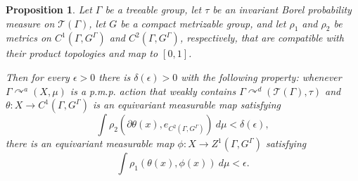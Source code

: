 \documentclass[12pt]{amsart}
\newtheorem{prop}[thm]{Proposition}
\theoremstyle{definition}
\def\cal{\mathcal}
\newcommand{\pmp}{p{$.$}m{$.$}p{$.$}}
\newcommand{\acts}{\curvearrowright}
\begin{document}
\begin{prop} \label{prop:weaktree}
	Let $\Gamma$ be a treeable group, let $\tau$ be an invariant Borel probability measure on $\cal T(\Gamma)$, let $G$ be a compact metrizable group, and let $\rho_1$ and $\rho_2$ be metrics on $C^1(\Gamma, G^\Gamma)$ and $C^2(\Gamma, G^\Gamma)$, respectively, that are compatible with their product topologies and map to $[0,1]$.
	
	Then for every $\epsilon > 0$ there is $\delta(\epsilon) > 0$ with the following property: whenever $\Gamma \acts^a (X, \mu)$ is a {\pmp} action that weakly contains $\Gamma \acts^d (\cal T(\Gamma), \tau)$ and $\theta: X \rightarrow C^1(\Gamma, G^\Gamma)$ is an equivariant measurable map satisfying
	\[\int \rho_2(\partial \theta(x), e_{C^2(\Gamma, G^\Gamma)}) \ d \mu < \delta(\epsilon),\]
	there is an equivariant measurable map $\phi : X \rightarrow Z^1(\Gamma, G^\Gamma)$ satisfying
	\[\int \rho_1(\theta(x), \phi(x)) \ d \mu < \epsilon.\]
\end{prop}
\end{document}
